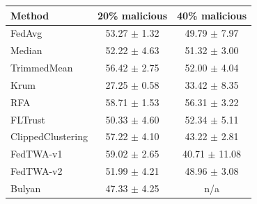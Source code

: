 \begin{tabular}{lcc}
\toprule
Method & 20\% malicious & 40\% malicious \\
\midrule
FedAvg & 53.27 $\pm$ 1.32 & 49.79 $\pm$ 7.97 \\
Median & 52.22 $\pm$ 4.63 & 51.32 $\pm$ 3.00 \\
TrimmedMean & 56.42 $\pm$ 2.75 & 52.00 $\pm$ 4.04 \\
Krum & 27.25 $\pm$ 0.58 & 33.42 $\pm$ 8.35 \\
RFA & 58.71 $\pm$ 1.53 & 56.31 $\pm$ 3.22 \\
FLTrust & 50.33 $\pm$ 4.60 & 52.34 $\pm$ 5.11 \\
ClippedClustering & 57.22 $\pm$ 4.10 & 43.22 $\pm$ 2.81 \\
FedTWA-v1 & 59.02 $\pm$ 2.65 & 40.71 $\pm$ 11.08 \\
FedTWA-v2 & 51.99 $\pm$ 4.21 & 48.96 $\pm$ 3.08 \\
Bulyan & 47.33 $\pm$ 4.25 & n/a \\
\bottomrule
\end{tabular}